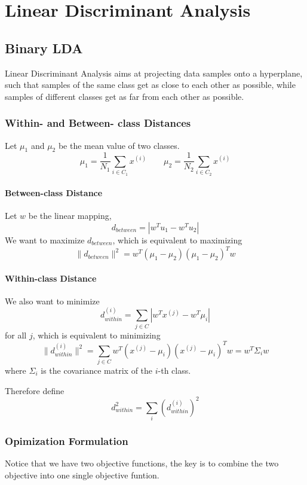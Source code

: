 \chapter{Linear Discriminant Analysis}
\newpage

\section{Binary LDA}
    Linear Discriminant Analysis aims at projecting data samples onto a hyperplane, such that samples of the same class get as close to each other as possible, while samples of different classes get as far from each other as possible.

    \subsection{Within- and Between- class Distances}
        Let $\mu_1$ and $\mu_2$ be the mean value of two classes.
        \[ \mu_1 = \frac{1}{N_1}\sum_{i\in C_1}x^{(i)} \qquad \mu_2 = \frac{1}{N_2}\sum_{i\in C_2}x^{(i)} \]

        \subsubsection{Between-class Distance}
        Let $w$ be the linear mapping,
        \[ d_{between} = |w^Tu_1 - w^Tu_2| \]
        We want to maximize $d_{between}$, which is equivalent to maximizing
        \[ \|d_{between}\|^2 = w^T(\mu_1-\mu_2)(\mu_1-\mu_2)^Tw\]

        \subsubsection{Within-class Distance}
        We also want to minimize
        \[ d_{within}^{(i)} = \sum_{j\in C}|w^Tx^{(j)} -w^T\mu_i| \]
        for all $j$, which is equivalent to minimizing
        \[ \|d_{within}^{(i)}\|^2 = \sum_{j\in C}w^T(x^{(j)}-\mu_i)(x^{(j)}-\mu_i)^Tw = w^T\Sigma_iw \]
        where $\Sigma_i$ is the covariance matrix of the $i$-th class.

        Therefore define
        \[ d_{within}^2 = \sum_i (d_{within}^{(i)})^2 \]

    \subsection{Opimization Formulation}
        Notice that we have two objective functions, the key is to combine the two objective into one single objective funtion.

